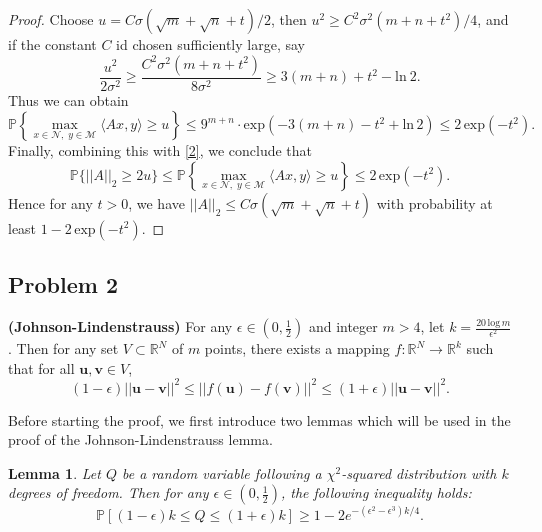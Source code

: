 \documentclass[11pt]{article}
\newtheorem{lemma}{Lemma}
\begin{document}
\begin{proof}
Choose $u=C\sigma(\sqrt{m}+\sqrt{n}+t)/2$, then $u^2 \geq C^2\sigma^2(m+n+t^2)/4$, and if the constant $C$ id chosen sufficiently large, say 
\[
\frac{u^2}{2\sigma^2} \geq \frac{C^2\sigma^2(m+n+t^2)}{8\sigma^2} \geq 3(m+n)+t^2-\text{ln}\ 2.
\]
Thus we can obtain
\[
\mathbb{P}\left\{\max\limits_{x\in\mathcal{N},\; y\in\mathcal{M}} \langle Ax,y \rangle \geq u\right\} \leq 9^{m+n} \cdot \text{exp}(-3(m+n)-t^2+\text{ln}\,2) \leq 2\,\text{exp}(-t^2).
\]
Finally, combining this with \eqref{2}, we conclude that
\[
\mathbb{P}\Bigg\{||A||_2 \geq 2u\Bigg\} \leq \mathbb{P}\left\{\max\limits_{x\in\mathcal{N},\; y\in\mathcal{M}} \langle Ax,y \rangle \geq u\right\} \leq 2\,\text{exp}(-t^2).
\]
Hence for any $t>0$, we have $||A||_2 \leq C\sigma(\sqrt{m}+\sqrt{n}+t)$ with probability at least $1-2\, \text{exp}(-t^2)$. 
\end{proof}



\subsection*{Problem 2}
\textbf{(Johnson-Lindenstrauss)} For any $\epsilon\in (0,\frac{1}{2})$ and integer $m>4$, let $k=\frac{20\, \text{log}\, m}{\epsilon^2}$. Then for any set $V\subset\mathbb{R}^N$ of $m$ points, there exists a mapping $f : \mathbb{R}^N \rightarrow \mathbb{R}^k$ such that for all $\textbf{u}, \textbf{v}\in V$,
\[
(1-\epsilon)||\textbf{u}-\textbf{v}||^2 \leq ||f(\textbf{u})-f(\textbf{v})||^2 \leq (1+\epsilon)||\textbf{u}-\textbf{v}||^2.
\]

\noindent Before starting the proof, we first introduce two lemmas which will be used in the proof of the Johnson-Lindenstrauss lemma. 

\begin{lemma}
    \label{L2}
    Let $Q$ be a random variable following a $\chi^2$-squared distribution with $k$ degrees of freedom. Then for any $\epsilon\in(0,\frac{1}{2})$, the following inequality holds:
    \[
    \mathbb{P}[(1-\epsilon)k \leq Q \leq (1+\epsilon)k] \geq 1-2e^{-(\epsilon^2-\epsilon^3)k/4}.
    \]
\end{lemma}
\end{document}
